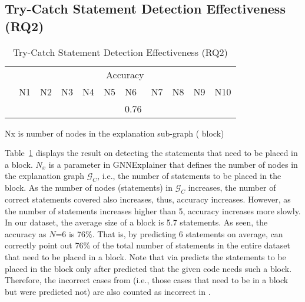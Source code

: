 \subsection{Try-Catch Statement Detection Effectiveness (RQ2)}
\label{sec:rq2}

\begin{table}[t]
  \caption{Try-Catch Statement Detection Effectiveness (RQ2)}
  \vspace{-12pt}
	\begin{center}
		\small
		\renewcommand{\arraystretch}{1} 
		\begin{tabular}{p{0.8cm}<{\centering}|p{0.4cm}<{\centering}|p{0.4cm}<{\centering}|p{0.4cm}<{\centering}|p{0.4cm}<{\centering}|p{0.4cm}<{\centering}|p{0.4cm}<{\centering}|p{0.4cm}<{\centering}|p{0.4cm}<{\centering}|p{0.4cm}<{\centering}|p{0.4cm}<{\centering}}
			\hline
			 	&  \multicolumn{10}{c}{Accuracy} \\
			\cline{2-11}
			     	&  N1  & N2   &  N3  & N4   &N5    & N6   &N7    & N8   &N9    & N10 \\
			\hline
			\tool       &  &  &  &  &  & 0.76 &  &  &  &   \\
			\hline
		\end{tabular}
		Nx is number of nodes in the explanation
                sub-graph ( block)
		\label{tab:rq2}
	\end{center}
\end{table}

Table~\ref{tab:rq2} displays the result on detecting the statements
that need to be placed in a  block. $N_x$ is a parameter
in GNNExplainer that defines the number of nodes in the explanation
graph $\mathcal{G}_C$, i.e., the number of statements to be placed in the
 block.
%
As the number of nodes (statements) in $\mathcal{G}_C$ increases, the
number of correct statements covered also increases, thus, accuracy
increases. However, as the number of statements increases higher than
5, accuracy increases more slowly. In our dataset, the average size of
a  block is 5.7 statements. As seen, the accuracy as
$N$=6 is 76\%. That is, by predicting 6 statements on average, {\tool}
can correctly point out 76\% of the total number of statements in the
entire dataset that need to be placed in a  block.
Note that {\tool} via {\xstate} predicts the statements to be placed
in the  block only after {\xblock} predicted that the
given code needs such a block. Therefore, the incorrect cases from
{\xblock} (i.e., those cases that need to be in a  block
but were predicted not) are also counted as incorrect in {\xstate}.

